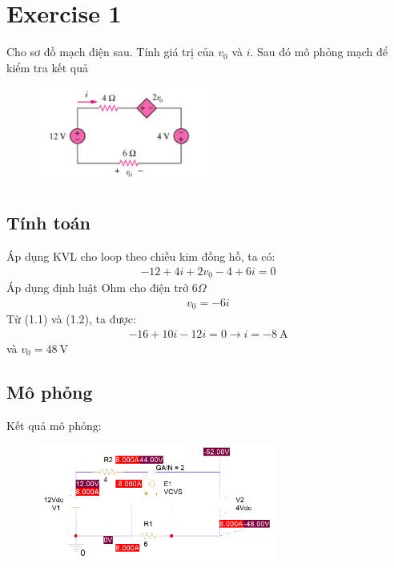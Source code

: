 \section{Exercise 1}
Cho sơ đồ mạch điện sau. Tính giá trị của $v_0$ và $i$. Sau đó mô phỏng mạch để kiểm tra kết quả
\begin{figure}[!htbp]
    \centering
    \includegraphics[width=0.5\textwidth]{graphics/ex1/f1.PNG}
    \caption{}
\end{figure}

\subsection{Tính toán}

Áp dụng KVL cho loop theo chiều kim đồng hồ, ta có:
\begin{align}
    -12 + 4i +2v_0 - 4 + 6i = 0
\end{align}
Áp dụng định luật Ohm cho điện trở $6 \Omega$
\begin{align}
    v_0 = -6i
\end{align}
Từ (1.1) và (1.2), ta được:
\begin{align*}
    -16 + 10i - 12i = 0 \rightarrow i = -8 \ \text{A}
\end{align*}
và \(v_0 = 48 \ \text{V}\)

\pagebreak

\subsection{Mô phỏng}

Kết quả mô phỏng:

\begin{figure}[!htbp]
    \centering
    \includegraphics[width=0.7\textwidth]{graphics/ex1/f2.PNG}
\end{figure}